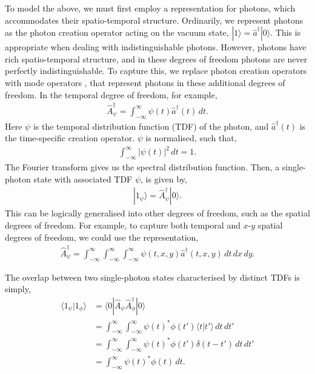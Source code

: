 \documentclass[aps,rmp,twocolumn,amsmath,amssymb,nofootinbib,superscriptaddress]{revtex4}
\newcommand{\bra}[1]{\langle#1|}
\newcommand{\ket}[1]{|#1\rangle}
\begin{document}
To model the above, we must first employ a representation for photons, which accommodates their spatio-temporal structure. Ordinarily, we represent photons as the photon creation operator acting on the vacuum state, \mbox{$\ket{1}=\hat{a}^\dag\ket{0}$}. This is appropriate when dealing with indistinguishable photons. However, photons have rich spatio-temporal structure, and in these degrees of freedom photons are never perfectly indistinguishable. To capture this, we replace photon creation operators with mode operators \cite{bib:RohdeMauerer}, that represent photons in these additional degrees of freedom. In the temporal degree of freedom, for example,
\begin{align}
\hat{A}^\dag_\psi = \int_{-\infty}^\infty \psi(t) \hat{a}^\dag(t) \,dt.
\end{align}
Here $\psi$ is the temporal distribution function (TDF) of the photon, and $\hat{a}^\dag(t)$ is the time-specific creation operator. $\psi$ is normalised, such that,
\begin{align}
\int_{-\infty}^\infty |\psi(t)|^2 \, dt = 1.
\end{align}
The Fourier transform gives us the spectral distribution function. Then, a single-photon state with associated TDF $\psi$, is given by,
\begin{align}
\ket{1_\psi} = \hat{A}^\dag_\psi \ket{0}.
\end{align}
This can be logically generalised into other degrees of freedom, such as the spatial degrees of freedom. For example, to capture both temporal and $x$-$y$ spatial degrees of freedom, we could use the representation,
\begin{align}
\hat{A}^\dag_\psi = \int_{-\infty}^\infty \int_{-\infty}^\infty \int_{-\infty}^\infty \psi(t,x,y) \hat{a}^\dag(t,x,y) \, dt\, dx\, dy.
\end{align}

The overlap between two single-photon states characterised by distinct TDFs is simply,
\begin{align}
\langle 1_\psi | 1_\phi \rangle &= \bra{0} \hat{A}_{\psi} \hat{A}^\dag_{\phi} \ket{0} \nonumber \\
&= \int_{-\infty}^\infty \int_{-\infty}^\infty \psi(t)^*\phi(t') \langle t|t'\rangle \, dt \, dt' \nonumber \\
&= \int_{-\infty}^\infty \int_{-\infty}^\infty \psi(t)^*\phi(t') \delta(t-t')\,dt \, dt' \nonumber \\
&= \int_{-\infty}^\infty \psi(t)^*\phi(t) \,dt.
\end{align}
\end{document}

